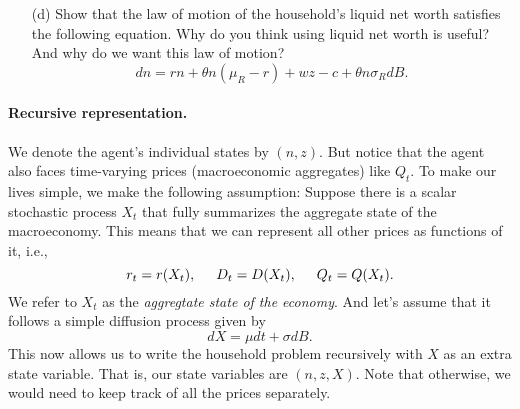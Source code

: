 \documentclass[11pt]{extarticle}
\theoremstyle{plain}
\theoremstyle{definition}
\begin{document}
\begin{enumerate}
\item [(d)] Show that the law of motion of the household's liquid net worth satisfies the following equation. Why do you think using liquid net worth is useful? And why do we want this law of motion?
\begin{equation*}
	dn = rn + \theta n (\mu_R - r) + wz - c + \theta n \sigma_R dB. 
\end{equation*}
\end{enumerate}


\paragraph{Recursive representation.} 
We denote the agent's individual states by $(n, z)$. But notice that the agent also faces time-varying prices (macroeconomic aggregates) like $Q_t$. To make our lives simple, we make the following assumption: Suppose there is a scalar stochastic process $X_t$ that fully summarizes the aggregate state of the macroeconomy. This means that we can represent all other prices as functions of it, i.e., 
\begin{equation*}
	r_t = r(X_t), \hspace{5mm}	D_t = D(X_t), \hspace{5mm}	Q_t = Q(X_t).
\end{equation*}
We refer to $X_t$ as the \textit{aggregtate state of the economy}. And let's assume that it follows a simple diffusion process given by
\begin{equation*}
	d X = \mu dt + \sigma dB.
\end{equation*}
This now allows us to write the household problem recursively with $X$ as an extra state variable. That is, our state variables are $(n, z, X)$. Note that otherwise, we would need to keep track of all the prices separately. 
\end{document}
